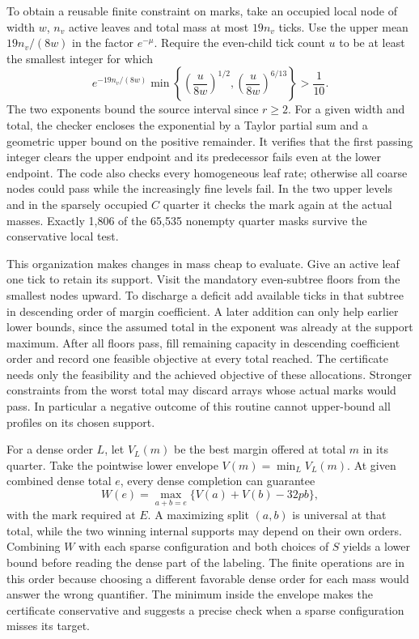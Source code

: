 \documentclass[12pt,letterpaper]{article}
\begin{document}
To obtain a reusable finite constraint on marks, take an occupied local node of width \(w\), \(n_v\) active leaves and total mass at most \(19n_v\) ticks. Use the upper mean \(19n_v/(8w)\) in the factor \(e^{-\mu}\). Require the even-child tick count \(u\) to be at least the smallest integer for which
\[
         e^{-19n_v/(8w)}
         \min\left\{\left(\frac{u}{8w}\right)^{1/2},
                    \left(\frac{u}{8w}\right)^{6/13}\right\}>\frac1{10}.
\]
The two exponents bound the source interval since \(r\ge2\). For a given width and total, the checker encloses the exponential by a Taylor partial sum and a geometric upper bound on the positive remainder. It verifies that the first passing integer clears the upper endpoint and its predecessor fails even at the lower endpoint. The code also checks every homogeneous leaf rate; otherwise all coarse nodes could pass while the increasingly fine levels fail. In the two upper levels and in the sparsely occupied \(C\) quarter it checks the mark again at the actual masses. Exactly 1,806 of the 65,535 nonempty quarter masks survive the conservative local test.

This organization makes changes in mass cheap to evaluate. Give an active leaf one tick to retain its support. Visit the mandatory even-subtree floors from the smallest nodes upward. To discharge a deficit add available ticks in that subtree in descending order of margin coefficient. A later addition can only help earlier lower bounds, since the assumed total in the exponent was already at the support maximum. After all floors pass, fill remaining capacity in descending coefficient order and record one feasible objective at every total reached. The certificate needs only the feasibility and the achieved objective of these allocations. Stronger constraints from the worst total may discard arrays whose actual marks would pass. In particular a negative outcome of this routine cannot upper-bound all profiles on its chosen support.

For a dense order \(L\), let \(V_L(m)\) be the best margin offered at total \(m\) in its quarter. Take the pointwise lower envelope \(V(m)=\min_L V_L(m)\). At given combined dense total \(e\), every dense completion can guarantee
\[
  W(e)=\max_{a+b=e}\{V(a)+V(b)-32pb\},
\]
with the mark required at \(E\). A maximizing split \((a,b)\) is universal at that total, while the two winning internal supports may depend on their own orders. Combining \(W\) with each sparse configuration and both choices of \(S\) yields a lower bound before reading the dense part of the labeling. The finite operations are in this order because choosing a different favorable dense order for each mass would answer the wrong quantifier. The minimum inside the envelope makes the certificate conservative and suggests a precise check when a sparse configuration misses its target.
\end{document}
